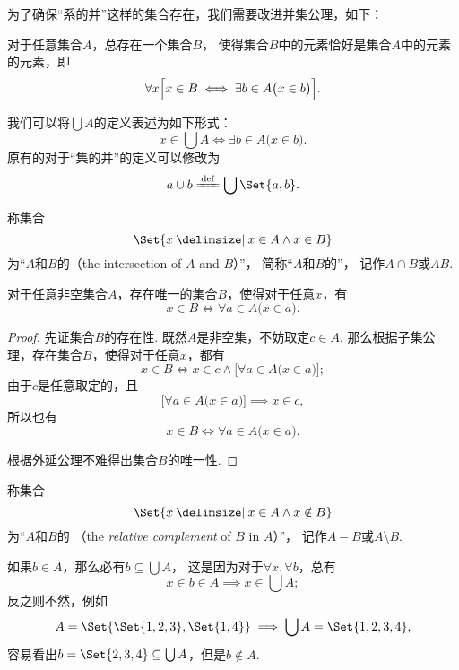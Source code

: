 为了确保“系的并”这样的集合存在，我们需要改进并集公理，如下：
\begin{axiom}[并集公理II]
对于任意集合\(A\)，总存在一个集合\(B\)，
使得集合\(B\)中的元素恰好是集合\(A\)中的元素的元素，即\[
	\forall x \Bigl[
		x \in B
		\iff
		\exists b \in A \bigl( x \in b \bigr)
	\Bigr].
\]
\end{axiom}

我们可以将\(\bigcup A\)的定义表述为如下形式：\[
	x \in \bigcup A
	\iff
	\exists b \in A \bigl( x \in b \bigr).
\]
原有的对于“集的并”的定义可以修改为\[
	a \cup b \defeq \bigcup\Set{a,b}.
\]



\begin{definition}
称集合\[
\Set{ x \given x \in A \land x \in B }
\]为“\(A\)和\(B\)的（the intersection of \(A\) and \(B\)）”，%
简称“\(A\)和\(B\)的”，%
记作\(A \cap B\)或\(AB\).
\end{definition}

\begin{theorem}\label{theorem:集合论.系的交的唯一存在性}
对于任意非空集合\(A\)，存在唯一的集合\(B\)，使得对于任意\(x\)，有\[
	x \in B
	\iff
	\forall a \in A \bigl( x \in a \bigr).
\]
\begin{proof}
先证集合\(B\)的存在性.
既然\(A\)是非空集，不妨取定\(c \in A\).
那么根据子集公理，存在集合\(B\)，使得对于任意\(x\)，都有\[
	x \in B
	\iff x \in c \land \bigl[ \forall a \in A \bigl( x \in a \bigr) \bigr];
\]
由于\(c\)是任意取定的，且\[
	\bigl[ \forall a \in A \bigl( x \in a \bigr) \bigr]
	\implies
	x \in c,
\]
所以也有\[
	x \in B
	\iff \forall a \in A \bigl( x \in a \bigr).
\]

根据外延公理不难得出集合\(B\)的唯一性.
\end{proof}
\end{theorem}

\begin{definition}
称集合\[
	\Set{ x \given x \in A \land x \notin B }
\]为“\(A\)和\(B\)的%
（the \emph{relative complement} of \(B\) in \(A\)）”，
记作\(A - B\)或\(A \setminus B\).
\end{definition}

\begin{example}
如果\(b \in A\)，那么必有\(b \subseteq \bigcup A\)，
这是因为对于\(\forall x, \forall b\)，总有\[
	x \in b \in A
	\implies
	x \in \bigcup A;
\]
反之则不然，例如\[
	A = \Set{\Set{1,2,3},\Set{1,4}}
	\implies
	\bigcup A = \Set{1,2,3,4},
\]
容易看出\(b = \Set{2,3,4} \subseteq \bigcup A\)，但是\(b \notin A\).
\end{example}

